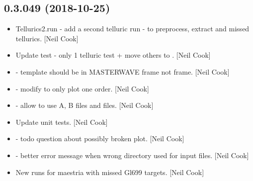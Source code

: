 \documentclass[a4paper,10pt,english]{report}
\begin{document}
\subsection{0.3.049 (2018-10-25)}
\label{\detokenize{misc/changelog:id282}}\begin{itemize}
\item {} 
Tellurics2.run - add a second telluric run - to preprocess, extract
and  missed tellurics. {[}Neil Cook{]}

\item {} 
Update test - only 1 telluric test + move others to . {[}Neil
Cook{]}

\item {} 
 - template should be in MASTERWAVE frame not 
frame. {[}Neil Cook{]}

\item {} 
 - modify  to only plot one
order. {[}Neil Cook{]}

\item {} 
 - allow  to use A, B files
and  files. {[}Neil Cook{]}

\item {} 
Update unit tests. {[}Neil Cook{]}

\item {} 
 - todo question about possibly broken plot. {[}Neil
Cook{]}

\item {} 
 - better error message when wrong directory used for
input files. {[}Neil Cook{]}

\item {} 
New  runs for maestria with missed Gl699 targets. {[}Neil Cook{]}

\end{itemize}
\end{document}
